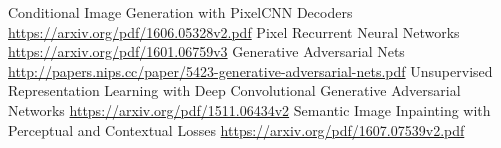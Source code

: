 \documentclass[10pt,twocolumn,letterpaper]{article}
\begin{document}
\begin{thebibliography}{1}
 Conditional Image Generation with PixelCNN Decoders \url{https://arxiv.org/pdf/1606.05328v2.pdf}
 Pixel Recurrent Neural Networks \url{https://arxiv.org/pdf/1601.06759v3}
 Generative Adversarial Nets \url{http://papers.nips.cc/paper/5423-generative-adversarial-nets.pdf}
 Unsupervised Representation Learning with Deep Convolutional Generative Adversarial Networks \url{https://arxiv.org/pdf/1511.06434v2}
 Semantic Image Inpainting with Perceptual and Contextual Losses \url{https://arxiv.org/pdf/1607.07539v2.pdf}
\end{thebibliography}

%


\end{document}
